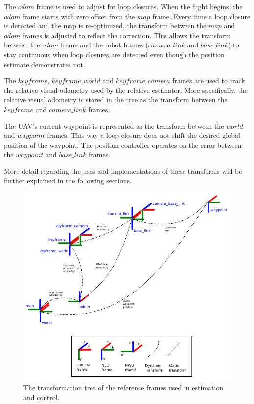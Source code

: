 \documentclass[letterpaper, 10 pt, conference]{ieeeconf}  %
\begin{document}
The $\mathit{odom}$ frame is used to adjust for loop closures. When the flight begins, the $\mathit{odom}$ frame starts with zero offset from the $\mathit{map}$ frame. Every time a loop closure is detected and the map is re-optimized, the transform between the $\mathit{map}$ and $\mathit{odom}$ frames is adjusted to reflect the correction. This allows the transform between the $\mathit{odom}$ frame and the robot frames ($\mathit{camera\_link}$ and $\mathit{base\_link}$) to stay continuous when loop closures are detected even though the position estimate demonstrates not.

The $\mathit{keyframe}$, $\mathit{keyframe\_world}$ and $\mathit{keyframe\_camera}$ frames are used to track the relative visual odometry used by the relative estimator. More specifically, the relative visual odometry is stored in the tree as the transform between the $\mathit{keyframe}$ and $\mathit{camera\_link}$ frames.

The UAV's current waypoint is represented as the transform between the $\mathit{world}$ and $\mathit{waypoint}$ frames. This way a loop closure does not shift the desired global position of the waypoint. The position controller operates on the error between the $\mathit{waypoint}$ and $\mathit{base\_link}$ frames.

More detail regarding the uses and implementations of these transforms will be further explained in the following sections.


\begin{figure}
\centering
\includegraphics[width=0.9\linewidth]{tf_tree_relative_rtab}
\caption{The transformation tree of the reference frames used in estimation and control.}
\label{fig:tf_tree}
\end{figure}
\end{document}

